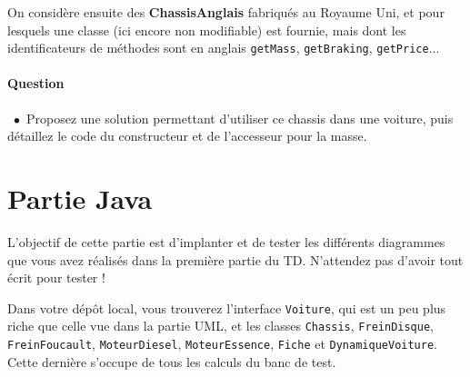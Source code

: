 \documentclass[a4paper,11pt]{exam}
\newcommand{\point}{$\bullet$\ }
\begin{document}
On considère ensuite des \textbf{ChassisAnglais} fabriqués au Royaume Uni, et pour lesquels une classe (ici encore non modifiable) est fournie, mais dont les identificateurs de méthodes sont en anglais \texttt{getMass}, \texttt{getBraking}, \texttt{getPrice}...

\paragraph*{\textsf{Question \thequestion}}\
\point Proposez une solution permettant d'utiliser ce chassis dans une voiture, puis détaillez le code du constructeur et de l'accesseur pour la masse.

\newpage

\section{Partie Java}

L'objectif de cette partie est d'implanter et de tester les différents diagrammes que vous avez réalisés dans la première partie du TD. N'attendez pas d'avoir tout écrit pour tester !

Dans votre dépôt local, vous trouverez l'interface {\tt Voiture}, qui est un peu plus riche que celle vue dans la partie UML, et les classes {\tt Chassis}, {\tt FreinDisque}, {\tt FreinFoucault}, {\tt MoteurDiesel}, {\tt MoteurEssence}, {\tt Fiche} et {\tt DynamiqueVoiture}. Cette dernière s'occupe de tous les calculs du banc de test.
\end{document}
